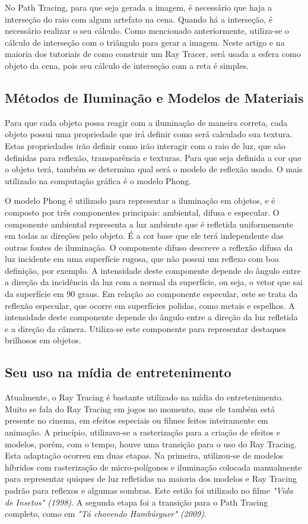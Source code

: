 \documentclass[journal]{IEEEtran}
\begin{document}
No Path Tracing, para que seja gerada a imagem, é necessário que haja a interseção
do raio com algum artefato na cena. Quando há a interseção, é necessário realizar
o seu cálculo. Como mencionado anteriormente, utiliza-se o cálculo de interseção
com o triângulo para gerar a imagem. Neste artigo e na maioria dos tutoriais
de como construir um Ray Tracer, será usada a esfera como objeto da cena, pois
seu cálculo de interseção com a reta é simples.


\subsection{Métodos de Iluminação e Modelos de Materiais}
Para que cada objeto possa reagir com a iluminação de maneira correta, cada objeto
possui uma propriedade que irá definir como será calculado sua textura. Estas propriedades
irão definir como irão interagir com o raio de luz, que são definidas para reflexão,
transparência e texturas. Para que seja definida a cor que o objeto terá, também se
determina qual será o modelo de reflexão usado. O mais utilizado na computação gráfica
é o modelo Phong.

O modelo Phong é utilizado para representar a iluminação em objetos, e é composto por
três componentes principais: ambiental, difusa e especular. O componente ambiental 
representa a luz ambiente que é refletida uniformemente em todas as direções pelo objeto.
É a cor base que ele terá independente das outras fontes de iluminação. O componente 
difuso descreve a reflexão difusa da luz incidente em uma superfície rugosa, que não
possui um reflexo com boa definição, por exemplo. A intensidade deste componente depende
do ângulo entre a direção da incidência da luz com a normal da superfície, ou seja, o 
vetor que sai da superfície em 90 graus. Em relação ao componente especular, este se 
trata da reflexão especular, que ocorre em superfícies polidas, como metais e espelhos.
A intensidade deste componente depende do ângulo entre a direção da luz refletida e a 
direção da câmera. Utiliza-se este componente para representar destaques brilhosos em
objetos.

\subsection{Seu uso na mídia de entretenimento}
Atualmente, o Ray Tracing é bastante utilizado na mídia do entretenimento. Muito se 
fala do Ray Tracing em jogos no momento, mas ele também está presente no cinema, em
efeitos especiais ou filmes feitos inteiramente em animação. A princípio, utilizava-se
a rasterização para a criação de efeitos e modelos, porém, com o tempo, houve uma 
transição para o uso do Ray Tracing. Esta adaptação ocorreu em duas
etapas. Na primeira, utilizou-se de modelos híbridos com rasterização de micro-polígonos
e iluminação colocada manualmente para representar quiques de luz refletidas na maioria
dos modelos e Ray Tracing padrão para reflexos e algumas sombras. Este estilo foi utilizado
no filme \emph{"Vida de Insetos" (1998)}. A segunda etapa foi a transição para o Path
Tracing completo, como em \emph{"Tá chovendo Hambúrguer" (2009)}.
\cite{c3} \cite{c1}
\end{document}

